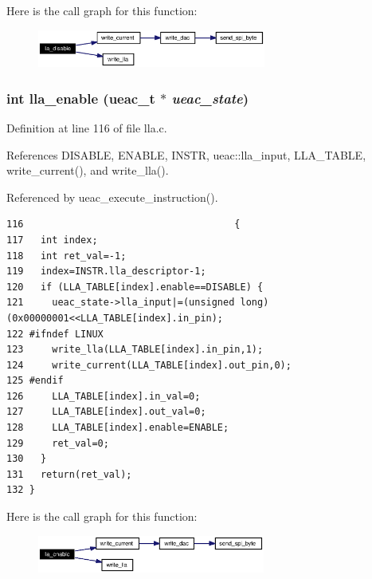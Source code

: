 Here is the call graph for this function:\begin{figure}[H]
\begin{center}
\leavevmode
\includegraphics[width=213pt]{lla_8c_a7_cgraph}
\end{center}
\end{figure}
\subsubsection{\setlength{\rightskip}{0pt plus 5cm}int lla\_\-enable ({\bf ueac\_\-t} $\ast$ {\em ueac\_\-state})}\label{lla_8c_a8}




Definition at line 116 of file lla.c.

References DISABLE, ENABLE, INSTR, ueac::lla\_\-input, LLA\_\-TABLE, write\_\-current(), and write\_\-lla().

Referenced by ueac\_\-execute\_\-instruction().

\footnotesize\begin{verbatim}116                                     {
117   int index;
118   int ret_val=-1;
119   index=INSTR.lla_descriptor-1;
120   if (LLA_TABLE[index].enable==DISABLE) {
121     ueac_state->lla_input|=(unsigned long)(0x00000001<<LLA_TABLE[index].in_pin);
122 #ifndef LINUX
123     write_lla(LLA_TABLE[index].in_pin,1);
124     write_current(LLA_TABLE[index].out_pin,0);
125 #endif 
126     LLA_TABLE[index].in_val=0;
127     LLA_TABLE[index].out_val=0;
128     LLA_TABLE[index].enable=ENABLE;
129     ret_val=0;
130   }
131   return(ret_val);
132 }
\end{verbatim}\normalsize 




Here is the call graph for this function:\begin{figure}[H]
\begin{center}
\leavevmode
\includegraphics[width=212pt]{lla_8c_a8_cgraph}
\end{center}
\end{figure}
